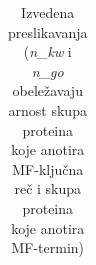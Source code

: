 \begin{table}[htpb]
\begin{tabular}{|p{4.7cm}|c|c|c|p{5cm}|}

\end{tabular}
  \caption{Izvedena preslikavanja \small 
  (\textit{n\_kw} i \textit{n\_go} obeležavaju arnost skupa proteina koje anotira MF-ključna reč i skupa proteina koje anotira MF-termin) }
  \label{tab:izvedeno_mapiranje}
\end{table}


